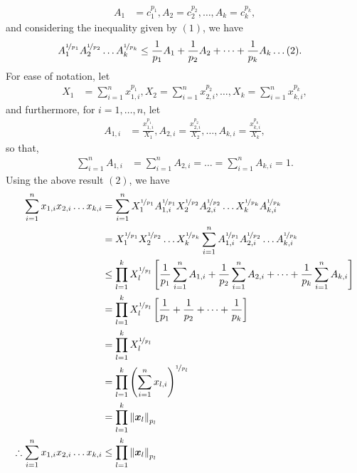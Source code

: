 \documentclass[a4paper,11pt]{article}
\newcommand{\ds}{\displaystyle}
\begin{document}
{{\begin{enumerate}[leftmargin=*]
			\begin{align*}
				A_1 & = c_1^{p_1}, A_2 = c_2^{p_2}, \dots , A_k = c_k^{p_k},
			\end{align*}
			and considering the inequality given by $\ds{(1)}$, we have 
			\begin{align*}
				A_1^{\nicefrac{1}{p_1}}A_2^{\nicefrac{1}{p_2}}\dots A_k^{\nicefrac{1}{p_k}} & \leq \frac{1}{p_1}A_1 + \frac{1}{p_2}A_2 + \dots + \frac{1}{p_k}A_k \dots (2).
			\end{align*}
			For ease of notation, let 
			\begin{align*}
				X_1 & = \sum_{i=1}^nx_{1,i}^{p_1}, X_2 = \sum_{i=1}^nx_{2,i}^{p_2}, \dots , X_k = \sum_{i=1}^nx_{k,i}^{p_k},
			\end{align*}
			and furthermore, for $\ds{i = 1,\dots,n}$, let
			\begin{align*}
				A_{1,i} & = \frac{x_{1,i}^{p_1}}{X_1}, A_{2,i} = \frac{x_{2,i}^{p_2}}{X_2}, \dots , A_{k,i} = \frac{x_{k,i}^{p_k}}{X_k},
			\end{align*}
			so that,
			\begin{align*}
				\sum_{i=1}^nA_{1,i} & = \sum_{i=1}^nA_{2,i} = \dots = \sum_{i=1}^nA_{k,i} = 1.
			\end{align*}
			Using the above result $\ds{(2)}$, we have
			\begin{align*}
				\sum_{i=1}^n x_{1,i}x_{2,i}\dots x_{k,i} & = \sum_{i=1}^nX_1^{\nicefrac{1}{p_1}}A_{1,i}^{\nicefrac{1}{p_1}}X_2^{\nicefrac{1}{p_2}}A_{2,i}^{\nicefrac{1}{p_2}}\dots X_k^{\nicefrac{1}{p_k}}A_{k,i}^{\nicefrac{1}{p_k}}\\
														 & = X_1^{\nicefrac{1}{p_1}}X_2^{\nicefrac{1}{p_2}}\dots X_k^{\nicefrac{1}{p_k}} \sum_{i=1}^nA_{1,i}^{\nicefrac{1}{p_1}}A_{2,i}^{\nicefrac{1}{p_2}}\dots A_{k,i}^{\nicefrac{1}{p_k}}\\
														 & \leq \prod_{l=1}^k X_l^{\nicefrac{1}{p_l}} \left[\frac{1}{p_1} \sum_{i=1}^n A_{1,i} + \frac{1}{p_2} \sum_{i=1}^n A_{2,i} + \dots + \frac{1}{p_k} \sum_{i=1}^n A_{k,i}\right]\\
														 & = \prod_{l=1}^k X_l^{\nicefrac{1}{p_l}} \left[\frac{1}{p_1} + \frac{1}{p_2} + \dots + \frac{1}{p_k} \right]\\
														 & = \prod_{l=1}^k X_l^{\nicefrac{1}{p_l}}\\
														 & = \prod_{l=1}^k \left(\sum_{i=1}^nx_{l,i} \right)^{\nicefrac{1}{p_l}}\\
														 & = \prod_{l=1}^k \left\lVert{\bm{x}_l}\right\rVert _{p_l}\\
				\therefore \sum_{i=1}^n x_{1,i}x_{2,i}\dots x_{k,i} & \leq \prod_{l=1}^k \left\lVert{\bm{x}_l}\right\rVert _{p_l}
			\end{align*}


\end{enumerate}}}
\end{document}
